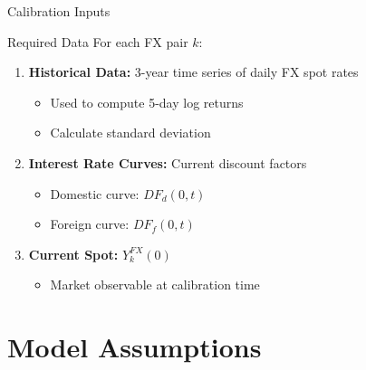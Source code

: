 \documentclass[11pt,aspectratio=169]{beamer}
\begin{document}
	\begin{frame}{Calibration Inputs}
		\begin{block}{Required Data}
			For each FX pair $k$:
		\end{block}
		
		\begin{enumerate}
			\item \textbf{Historical Data:} 3-year time series of daily FX spot rates
			\begin{itemize}
				\item Used to compute 5-day log returns
				\item Calculate standard deviation
			\end{itemize}
			
			\item \textbf{Interest Rate Curves:} Current discount factors
			\begin{itemize}
				\item Domestic curve: $DF_d(0,t)$
				\item Foreign curve: $DF_f(0,t)$
			\end{itemize}
			
			\item \textbf{Current Spot:} $Y_k^{FX}(0)$
			\begin{itemize}
				\item Market observable at calibration time
			\end{itemize}
		\end{enumerate}
	\end{frame}
	
	\section{Model Assumptions}
	
\end{document}
